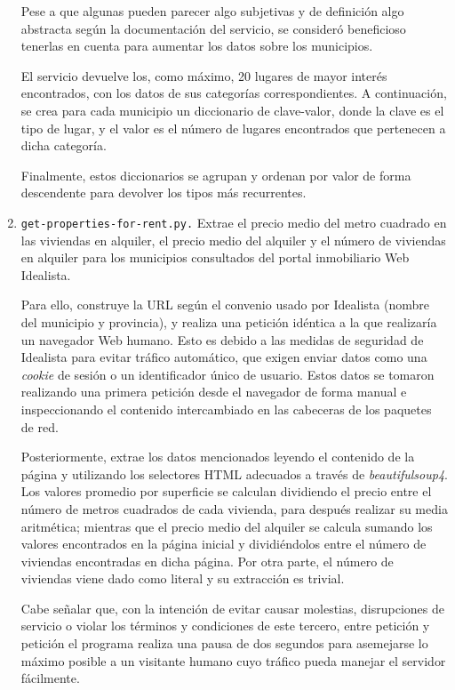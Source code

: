 \begin{enumerate}
    Pese a que algunas pueden parecer algo subjetivas y de definición algo abstracta según la documentación del servicio, se consideró beneficioso tenerlas en cuenta para aumentar los datos sobre los municipios.

    El servicio devuelve los, como máximo, 20 lugares de mayor interés encontrados, con los datos de sus categorías correspondientes. A continuación, se crea para cada municipio un diccionario de clave-valor, donde la clave es el tipo de lugar, y el valor es el número de lugares encontrados que pertenecen a dicha categoría.

    Finalmente, estos diccionarios se agrupan y ordenan por valor de forma descendente para devolver los tipos más recurrentes.

    \item \texttt{get-properties-for-rent.py.} Extrae el precio medio del metro cuadrado en las viviendas en alquiler, el precio medio del alquiler y el número de viviendas en alquiler para los municipios consultados del portal inmobiliario Web Idealista.

    Para ello, construye la URL según el convenio usado por Idealista (nombre del municipio y provincia), y realiza una petición idéntica a la que realizaría un navegador Web humano. Esto es debido a las medidas de seguridad de Idealista para evitar tráfico automático, que exigen enviar datos como una \textit{cookie} de sesión o un identificador único de usuario. Estos datos se tomaron realizando una primera petición desde el navegador de forma manual e inspeccionando el contenido intercambiado en las cabeceras de los paquetes de red.

    Posteriormente, extrae los datos mencionados leyendo el contenido de la página y utilizando los selectores HTML adecuados a través de \textit{beautifulsoup4}. Los valores promedio por superficie se calculan dividiendo el precio entre el número de metros cuadrados de cada vivienda, para después realizar su media aritmética; mientras que el precio medio del alquiler se calcula sumando los valores encontrados en la página inicial y dividiéndolos entre el número de viviendas encontradas en dicha página. Por otra parte, el número de viviendas viene dado como literal y su extracción es trivial.

    Cabe señalar que, con la intención de evitar causar molestias, disrupciones de servicio o violar los términos y condiciones de este tercero, entre petición y petición el programa realiza una pausa de dos segundos para asemejarse lo máximo posible a un visitante humano cuyo tráfico pueda manejar el servidor fácilmente.


\end{enumerate}
